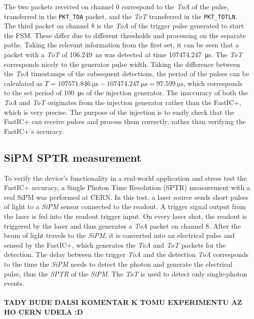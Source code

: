 The two packets received on channel 0 correspond to the \emph{ToA} of the pulse, transferred in the \verb|PKT_TOA| packet, and the \emph{ToT} transferred in the \verb|PKT_TOTLN|. The third packet on channel 8 is the \emph{ToA} of the trigger pulse generated to start the FSM. These differ due to different thresholds and processing on the separate paths. Taking the relevant information from the first set, it can be seen that a packet with a \emph{ToT} of \SI{106.249}{\nano\second} was detected at time \SI{107474.247}{\micro\second}. The \emph{ToT} corresponds nicely to the generator pulse width. Taking the difference between the \emph{ToA} timestamps of the subsequent detections, the period of the pulses can be calculated as $T = \SI{107571.846}{\micro\second} - \SI{107474.247}{\micro\second} = \SI{97.599}{\micro\second}$, which corresponds to the set period of \SI{100}{\micro\second} of the injection generator. The inaccuracy of both the \emph{ToA} and \emph{ToT} originates from the injection generator rather than the FastIC+, which is very precise. The purpose of the injection is to easily check that the FastIC+ can receive pulses and process them correctly, rather than verifying the FastIC+'s accuracy. 


\subsection{SiPM SPTR measurement}
To verify the device's functionality in a real-world application and stress test the FastIC+ accuracy, a Single Photon Time Resolution (SPTR) measurement with a real SiPM was performed at CERN. In this test, a laser source sends short pulses of light to a \emph{SiPM} sensor connected to the readout. A trigger signal output from the laser is fed into the readout trigger input. On every laser shot, the readout is triggered by the laser and thus generates a \emph{ToA} packet on channel 8. After the beam of light travels to the \emph{SiPM}, it is converted into an electrical pulse and sensed by the FastIC+, which generates the \emph{ToA} and \emph{ToT} packets for the detection. The delay between the trigger \emph{ToA} and the detection \emph{ToA} corresponds to the time the \emph{SiPM} needs to detect the photon and generate the electrical pulse, thus the \emph{SPTR} of the \emph{SiPM}. The \emph{ToT} is used to detect only single-photon events. 
\\
\\
\large \textbf{TADY BUDE DALSI KOMENTAR K TOMU EXPERIMENTU AZ HO CERN UDELA :D}